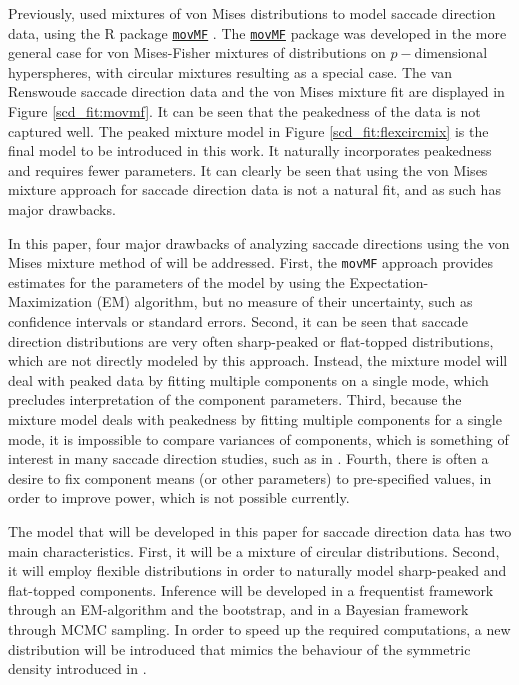 Previously, \citet{van2016infants}  used mixtures of von Mises distributions to model saccade direction data, using the R  package \href{https://cran.r-project.org/web/packages/movMF/index.html}{\texttt{movMF}} \citep{hornik2014movmf}. The \href{https://cran.r-project.org/web/packages/movMF/index.html}{\texttt{movMF}} package was developed in the more general case for von Mises-Fisher mixtures of distributions on \(p-\)dimensional hyperspheres, with circular mixtures resulting as a special case.  The van Renswoude saccade direction data and the von Mises mixture fit are displayed in Figure \ref{scd_fit:movmf}. It can be seen that the peakedness of the data is not captured well.  The peaked mixture model in Figure \ref{scd_fit:flexcircmix} is the final model to be introduced in this work. It naturally incorporates peakedness and requires fewer parameters.  It can clearly be seen that using the von Mises mixture approach for  saccade direction data is not a natural fit, and as such has major drawbacks.

In this paper, four major drawbacks of analyzing saccade directions using the von Mises mixture method of \citet{hornik2014movmf} will be addressed. First, the \texttt{movMF} approach provides estimates for the parameters of the model by using the Expectation-Maximization (EM) algorithm, but no measure of their uncertainty, such as confidence intervals or standard errors. Second, it can be seen that saccade direction distributions are very often sharp-peaked or flat-topped distributions, which are not directly modeled by this approach. Instead, the mixture model will deal with peaked data by fitting multiple components on a single mode, which precludes interpretation of the component parameters. Third, because the mixture model deals with peakedness by fitting multiple components for a single mode, it is impossible to compare variances of components, which is something of interest in many saccade direction studies, such as in \citet{van2016infants}. Fourth, there is often a desire to fix component means (or other parameters) to pre-specified values, in order to improve power, which is not possible currently.

The model that will be developed in this paper for saccade direction data has two main characteristics. First, it will be a mixture of circular distributions. Second, it will employ flexible distributions in order to naturally model sharp-peaked and flat-topped components. Inference will be developed in a frequentist framework through an EM-algorithm and the bootstrap, and in a Bayesian framework through MCMC sampling. In order to speed up the required computations, a new distribution will be introduced that mimics the behaviour of the symmetric density introduced in \citet{jones2012inverse}.

